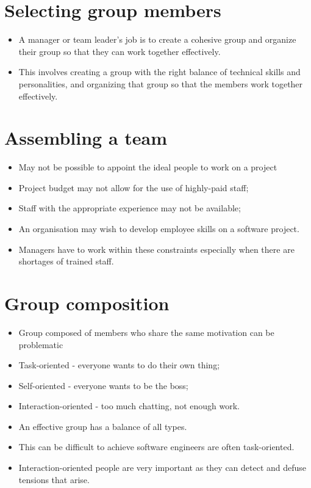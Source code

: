 \section{ Selecting group members}
\begin{itemize}

\item A manager or team leader’s job is to create a cohesive group and organize their group so that they can work together effectively.

\item This involves creating a group with the right balance of technical skills and personalities, and organizing that group so that the members work together effectively.


\end{itemize}
\section{ Assembling a team}
\begin{itemize}

\item May not be possible to appoint the ideal people to work on a project

  \item Project budget may not allow for the use of highly-paid staff;   \item Staff with the appropriate experience may not be available;
  \item An organisation may wish to develop employee skills on a software project.

\item Managers have to work within these constraints especially when there are shortages of trained staff.

\end{itemize} \section{ Group composition}
\begin{itemize}

\item Group composed of members who share the same motivation can be problematic

  \item Task-oriented - everyone wants to do their own thing;   \item Self-oriented - everyone wants to be the boss;   \item Interaction-oriented - too much chatting, not enough work.
\item An effective group has a balance of all types.

\item This can be difficult to achieve software engineers are often task-oriented.

\item Interaction-oriented people are very important as they can detect and defuse tensions that arise.


\end{itemize}
